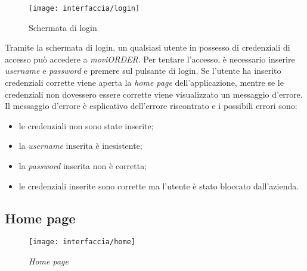 \begin{figure}[!h] 
    \centering 
    \texttt{[image: interfaccia/login]} 
    \caption{Schermata di login}
\end{figure}

Tramite la schermata di login, un qualsiasi utente in possesso di credenziali di accesso può accedere a \textit{moviORDER}. Per tentare l'accesso, è necessario inserire \textit{username} e \textit{password} e premere sul pulsante di login. Se l'utente ha inserito credenziali corrette viene aperta la \textit{home page} dell'applicazione, mentre se le credenziali non dovessero essere corrette viene visualizzato un messaggio d'errore. Il messaggio d'errore è esplicativo dell'errore riscontrato e i possibili errori sono:
\begin{itemize}
	\item le credenziali non sono state inserite;
	\item la \textit{username} inserita è inesistente;
	\item la \textit{password} inserita non è corretta;
	\item le credenziali inserite sono corrette ma l'utente è stato bloccato dall'azienda.
\end{itemize}

\subsection{Home page}

\begin{figure}[!h] 
    \centering 
    \texttt{[image: interfaccia/home]} 
    \caption{\textit{Home page}}
\end{figure}

